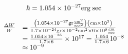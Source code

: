 \begin{equation}
\hbar = 1.054 \times 10^{-27} {\rm erg \; sec}
\end{equation}

\begin{equation}
\begin{array}{rl}
\frac{\Delta W}{W} &= \frac{\left( 1.054 \times 10^{-27} {\rm gr} \frac{{\rm cm^2}}{{\rm sec^2}} \right) \left( {\rm cm} \times 10^2 \right)}{1.7 \times 10^{-24} {\rm gr} \times 10^{-2} {\rm cm^2} \times 6 \times 10^9 \frac{{\rm cm}}{{\rm sec}}} \\
&= \frac{1.054 \times 10^{-25}}{1.7 \times 6} \times 10^{17} = \frac{1.054}{1.7 \times 6} 10^{-8} \\
&\approx 10^{-9}
\end{array}
\end{equation}

